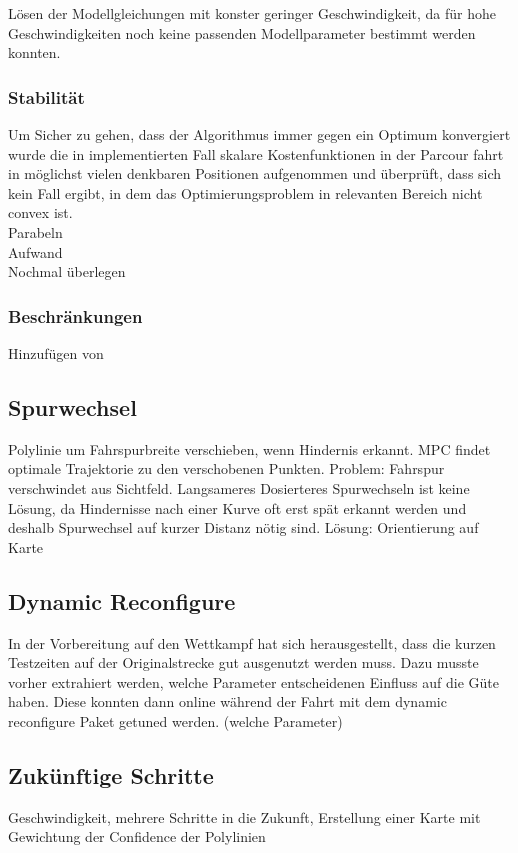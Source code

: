 Lösen der Modellgleichungen mit konster geringer Geschwindigkeit, da für hohe Geschwindigkeiten noch keine passenden Modellparameter bestimmt werden konnten.
\subsubsection{Stabilität}
Um Sicher zu gehen, dass der Algorithmus immer gegen ein Optimum konvergiert wurde die in implementierten Fall skalare Kostenfunktionen in der Parcour fahrt in möglichst vielen denkbaren Positionen aufgenommen und überprüft, dass sich kein Fall ergibt, in dem das Optimierungsproblem in relevanten Bereich nicht convex ist.
\\
Parabeln
\\
Aufwand\\
Nochmal überlegen\\

\subsubsection{Beschränkungen}
Hinzufügen von ~
\subsection{Spurwechsel}
Polylinie um Fahrspurbreite verschieben, wenn Hindernis erkannt. MPC findet optimale Trajektorie zu den verschobenen Punkten. Problem: Fahrspur verschwindet aus Sichtfeld. Langsameres Dosierteres Spurwechseln ist keine Lösung, da Hindernisse nach einer Kurve oft erst spät erkannt werden und deshalb Spurwechsel auf kurzer Distanz nötig sind. Lösung: Orientierung auf Karte

\subsection{Dynamic Reconfigure}
In der Vorbereitung auf den Wettkampf hat sich herausgestellt, dass die kurzen Testzeiten auf der Originalstrecke gut ausgenutzt werden muss. Dazu musste vorher extrahiert werden, welche Parameter entscheidenen Einfluss auf die Güte haben. Diese konnten dann online während der Fahrt mit dem dynamic reconfigure Paket getuned werden. (welche Parameter)\\
\subsection{Zukünftige Schritte}
Geschwindigkeit, mehrere Schritte in die Zukunft, Erstellung einer Karte mit Gewichtung der Confidence der Polylinien
